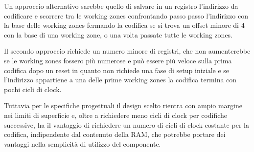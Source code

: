 \documentclass[a4paper]{article}
\begin{document}
Un approccio alternativo sarebbe quello di salvare in un registro l'indirizzo da codificare e scorrere tra le working zones confrontando passo passo l'indirizzo con la base delle working zones fermando la codifica se si trova un offset minore di 4 con la base di una working zone, o una volta passate tutte le working zones.

Il secondo approccio richiede un numero minore di registri, che non aumenterebbe se le working zones fossero più numerose e può essere più veloce sulla prima codifica dopo un reset in quanto non richiede una fase di setup iniziale e se l'indirizzo appartiene a una delle prime working zones la codifica termina con pochi cicli di clock.

Tuttavia per le specifiche progettuali il design scelto rientra con ampio margine nei limiti di superficie e, oltre a richiedere meno cicli di clock per codifiche successive, ha il vantaggio di richiedere un numero di cicli di clock costante per la codifica, indipendente dal contenuto della RAM, che potrebbe portare dei vantaggi nella semplicità di utilizzo del componente.
\end{document}
